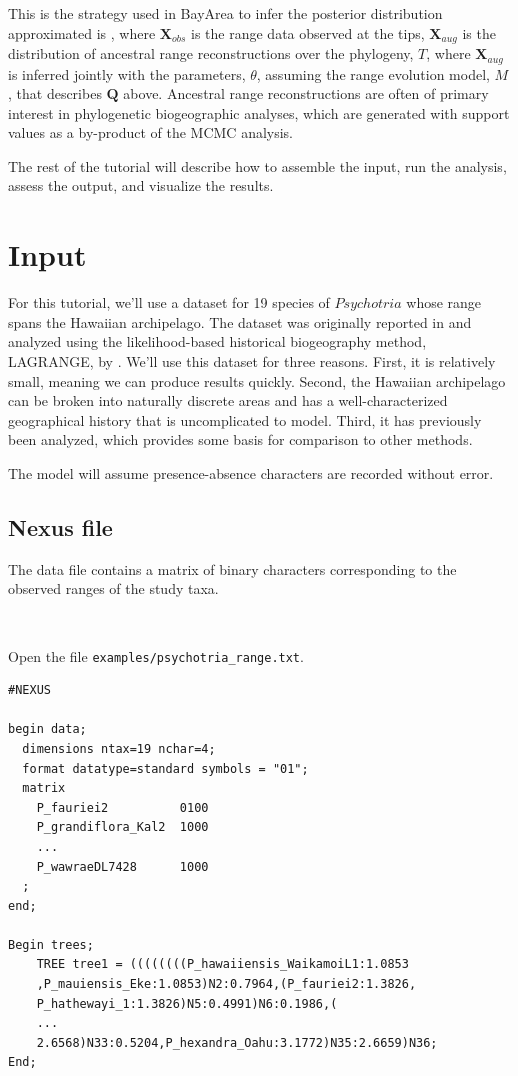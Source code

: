 \documentclass[11pt]{article}
\newcommand{\impmark}{\strut\vadjust{\domark}}
\newcommand{\domark}{%
  \vbox to 0pt{
    \kern-\dp\strutbox
    \smash{\llap{$\rightarrow$\kern1em}}
    \vss
  }%
}
\begin{document}
This is the strategy used in BayArea to infer the posterior distribution approximated is 
, where $\textbf{X}_{obs}$ is the range data observed at the tips, $\textbf{X}_{aug}$ is the distribution of ancestral range reconstructions over the phylogeny, $T$, where $\textbf{X}_{aug}$ is inferred jointly with the parameters, $\theta$, assuming the range evolution model, $M$, that describes $\textbf{Q}$ above.
Ancestral range reconstructions are often of primary interest in phylogenetic biogeographic analyses, which are generated with support values as a by-product of the MCMC analysis.

The rest of the tutorial will describe how to assemble the input, run the analysis, assess the output, and visualize the results.

\newpage

\section{Input}

For this tutorial, we'll use a dataset for 19 species of $Psychotria$ whose range spans the Hawaiian archipelago.
The dataset was originally reported in \citet{nepokroeff03} and analyzed using the likelihood-based historical biogeography method, LAGRANGE, by \citet{ree08}.
We'll use this dataset for three reasons.
First, it is relatively small, meaning we can produce results quickly.
Second, the Hawaiian archipelago can be broken into naturally discrete areas and has a well-characterized geographical history that is uncomplicated to model.
Third, it has previously been analyzed, which provides some basis for comparison to other methods.

The model will assume presence-absence characters are recorded without error.

\subsection{Nexus file}

The data file contains a matrix of binary characters corresponding to the observed ranges of the study taxa.

\noindent \\ \impmark  Open the file \texttt{examples/psychotria\_range.txt}.

\begin{framed}
\begin{lstlisting}
#NEXUS

begin data;
  dimensions ntax=19 nchar=4;
  format datatype=standard symbols = "01";
  matrix
    P_fauriei2          0100
    P_grandiflora_Kal2  1000
    ...
    P_wawraeDL7428      1000	
  ;
end;

Begin trees;
	TREE tree1 = ((((((((P_hawaiiensis_WaikamoiL1:1.0853
	,P_mauiensis_Eke:1.0853)N2:0.7964,(P_fauriei2:1.3826,
	P_hathewayi_1:1.3826)N5:0.4991)N6:0.1986,(
	...
	2.6568)N33:0.5204,P_hexandra_Oahu:3.1772)N35:2.6659)N36;
End;
\end{lstlisting}
\end{framed}
\end{document}
